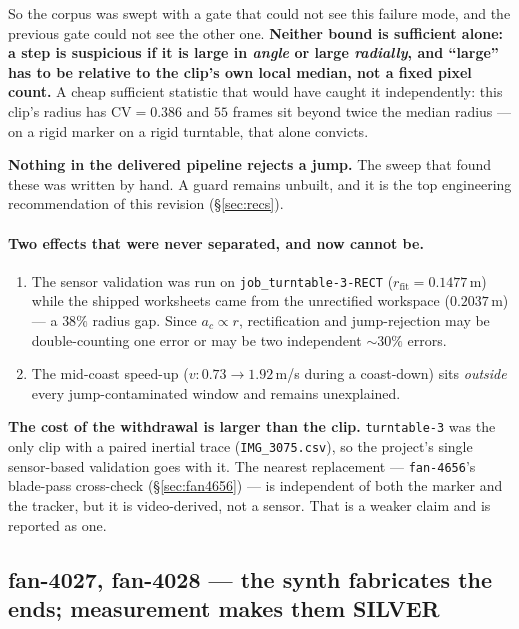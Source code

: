 \documentclass[11pt,a4paper]{article}
\begin{document}
So the corpus was swept with a gate that could not see this failure mode, and the previous gate
could not see the other one. \textbf{Neither bound is sufficient alone: a step is suspicious if
it is large in \emph{angle} or large \emph{radially}, and ``large'' has to be relative to the
clip's own local median, not a fixed pixel count.} A cheap sufficient statistic that would have
caught it independently: this clip's radius has $\mathrm{CV} = 0.386$ and $55$ frames sit beyond
twice the median radius --- on a rigid marker on a rigid turntable, that alone convicts.

\textbf{Nothing in the delivered pipeline rejects a jump.} The sweep that found these was written
by hand. A guard remains unbuilt, and it is the top engineering recommendation of this revision
(\S\ref{sec:recs}).

\paragraph{Two effects that were never separated, and now cannot be.}
\begin{enumerate}
  \item The sensor validation was run on \texttt{job\_turntable-3-RECT} ($r_{\mathrm{fit}} =
  0.1477$\,m) while the shipped worksheets came from the unrectified workspace ($0.2037$\,m) --- a
  $38\%$ radius gap. Since $a_c \propto r$, rectification and jump-rejection may be
  double-counting one error or may be two independent ${\sim}30\%$ errors.
  \item The mid-coast speed-up ($v: 0.73 \to 1.92$\,m/s during a coast-down) sits \emph{outside}
  every jump-contaminated window and remains unexplained.
\end{enumerate}

\textbf{The cost of the withdrawal is larger than the clip.} \texttt{turntable-3} was the only
clip with a paired inertial trace (\texttt{IMG\_3075.csv}), so the project's single sensor-based
validation goes with it. The nearest replacement --- \texttt{fan-4656}'s blade-pass cross-check
(\S\ref{sec:fan4656}) --- is independent of both the marker and the tracker, but it is
video-derived, not a sensor. That is a weaker claim and is reported as one.

\subsection{fan-4027, fan-4028 --- the synth fabricates the ends; measurement makes them SILVER}
\label{sec:fans}
\end{document}

